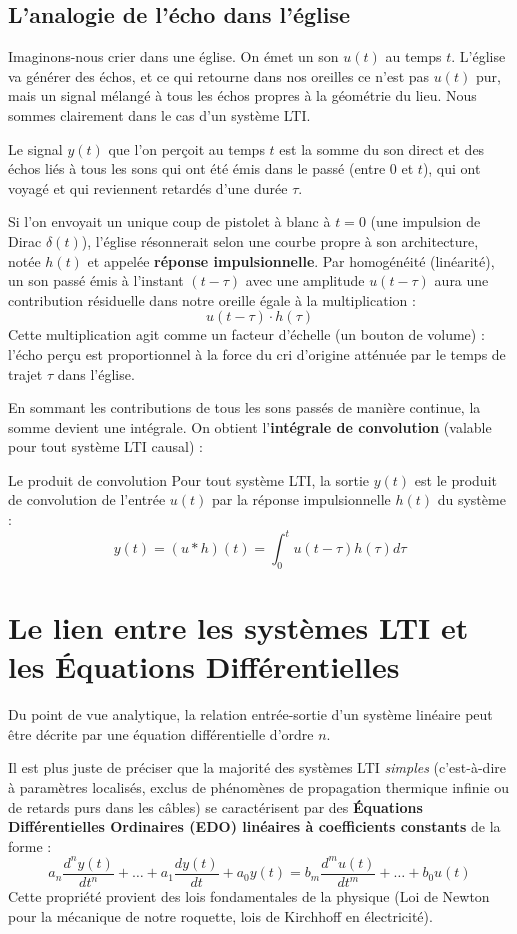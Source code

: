\documentclass[11pt,a4paper]{report}
\begin{document}
\subsection{L'analogie de l'écho dans l'église}
Imaginons-nous crier dans une église. On émet un son $u(t)$ au temps $t$. L'église va générer des échos, et ce qui retourne dans nos oreilles ce n'est pas $u(t)$ pur, mais un signal mélangé à tous les échos propres à la géométrie du lieu. Nous sommes clairement dans le cas d'un système LTI.

Le signal $y(t)$ que l'on perçoit au temps $t$ est la somme du son direct et des échos liés à tous les sons qui ont été émis dans le passé (entre $0$ et $t$), qui ont voyagé et qui reviennent retardés d'une durée $\tau$. 

Si l'on envoyait un unique coup de pistolet à blanc à $t=0$ (une impulsion de Dirac $\delta(t)$), l'église résonnerait selon une courbe propre à son architecture, notée $h(t)$ et appelée \textbf{réponse impulsionnelle}. Par homogénéité (linéarité), un son passé émis à l'instant $(t-\tau)$ avec une amplitude $u(t-\tau)$ aura une contribution résiduelle dans notre oreille égale à la multiplication :
\[ u(t-\tau) \cdot h(\tau) \]
Cette multiplication agit comme un facteur d'échelle (un bouton de volume) : l'écho perçu est proportionnel à la force du cri d'origine atténuée par le temps de trajet $\tau$ dans l'église.

En sommant les contributions de tous les sons passés de manière continue, la somme devient une intégrale. On obtient l'\textbf{intégrale de convolution} (valable pour tout système LTI causal) :
\begin{importantbox}{Le produit de convolution}
    Pour tout système LTI, la sortie $y(t)$ est le produit de convolution de l'entrée $u(t)$ par la réponse impulsionnelle $h(t)$ du système :
    \[ y(t) = (u * h)(t) = \int_{0}^{t} u(t-\tau)h(\tau)d\tau \]
\end{importantbox}

\section{Le lien entre les systèmes LTI et les Équations Différentielles}

Du point de vue analytique, la relation entrée-sortie d'un système linéaire peut être décrite par une équation différentielle d'ordre $n$. 

Il est plus juste de préciser que la majorité des systèmes LTI \textit{simples} (c'est-à-dire à paramètres localisés, exclus de phénomènes de propagation thermique infinie ou de retards purs dans les câbles) se caractérisent par des \textbf{Équations Différentielles Ordinaires (EDO) linéaires à coefficients constants} de la forme :
\[ a_n \frac{d^ny(t)}{dt^n} + \dots + a_1 \frac{dy(t)}{dt} + a_0 y(t) = b_m \frac{d^mu(t)}{dt^m} + \dots + b_0 u(t) \]
Cette propriété provient des lois fondamentales de la physique (Loi de Newton pour la mécanique de notre roquette, lois de Kirchhoff en électricité). 
\end{document}
